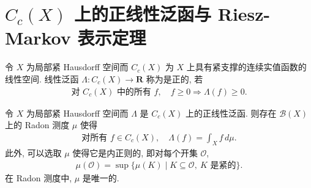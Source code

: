 \documentclass[../../main.tex]{subfiles}
\begin{document}
\section{$C_{c}(X)$ 上的正线性泛函与 Riesz-Markov 表示定理}\label{section:ch21-rieszmarkov}

令 $X$ 为局部紧 Hausdorff 空间而 $C_{c}(X)$ 为 $X$ 上具有紧支撑的连续实值函数的线性空间. 线性泛函 $\Lambda:C_{c}(X)\to\mathbf{R}$ 称为是正的, 若
\begin{align*}
\text{对 }C_{c}(X)\text{ 中的所有 }f,\quad f\geqslant 0\Rightarrow\Lambda(f)\geqslant 0.
\end{align*}

\begin{theorem}\label{theorem:ch21-rieszmarkov}
令 $X$ 为局部紧 Hausdorff 空间而 $\Lambda$ 是 $C_{c}(X)$ 上的正线性泛函. 则存在 $\mathcal{B}(X)$ 上的 Radon 测度 $\mu$ 使得
\begin{align}\label{align:ch21-rieszmarkov等式}
\text{对所有 }f\in C_{c}(X),\quad\Lambda(f)=\int_{X}f\,d\mu.
\end{align}
此外, 可以选取 $\mu$ 使得它是内正则的, 即对每个开集 $\mathcal{O}$,
\begin{align*}
\mu(\mathcal{O})=\sup\{\mu(K)\mid K\subseteq\mathcal{O},\ K\text{ 是紧的}\}.
\end{align*}
在 Radon 测度中, $\mu$ 是唯一的.
\end{theorem}
\end{document}
